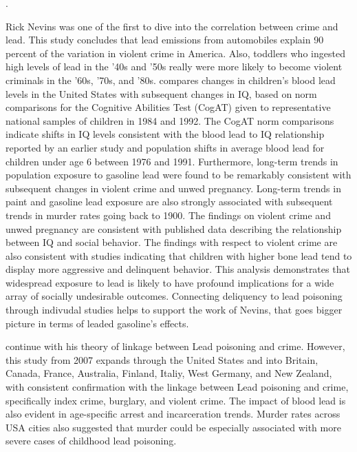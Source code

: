 \documentclass{article}
\begin{document}
\noindent {}.

\medskip

Rick Nevins was one of the first to dive into the correlation between crime and lead. This study concludes that lead emissions from automobiles explain 90 percent of the variation in violent crime in America. Also, toddlers who ingested high levels of lead in the '40s and '50s really were more likely to become violent criminals in the '60s, '70s, and '80s. \cite{nevin2000lead} compares changes in children’s blood lead levels in the United States with subsequent changes in IQ, based on norm comparisons for the Cognitive Abilities Test (CogAT) given to representative national samples of children in 1984 and 1992. The CogAT norm comparisons indicate shifts in IQ levels consistent with the blood lead to IQ relationship reported by an earlier study and population shifts in average blood lead for children under age 6 between 1976 and 1991. Furthermore, long-term trends in population exposure to gasoline lead were found to be remarkably consistent with subsequent changes in violent crime and unwed pregnancy. Long-term trends in paint and gasoline lead exposure are also strongly associated with subsequent trends in murder rates going back to 1900. The findings on violent crime and unwed pregnancy are consistent with published data describing the relationship between IQ and social behavior. The findings with respect to violent crime are also consistent with studies indicating that children with higher bone lead tend to display more aggressive and delinquent behavior. This analysis demonstrates that widespread exposure to lead is likely to have profound implications for a wide array of socially undesirable outcomes. Connecting deliquency to lead poisoning through indivudal studies helps to support the work of Nevins, that goes bigger picture in terms of leaded gasoline's effects. 

\medskip

\noindent {}

\medskip

\cite{nevin2007understanding} continue with his theory of linkage between Lead poisoning and crime. However, this study from 2007 expands through the United States and into Britain, Canada, France, Australia, Finland, Italiy, West Germany, and New Zealand, with consistent confirmation with the linkage between Lead poisoning and crime, specifically index crime, burglary, and violent crime. The impact of blood lead is also evident in age-specific arrest and incarceration trends. Murder rates across USA cities also suggested that murder could be especially associated with more severe cases of childhood lead poisoning.
\end{document}
